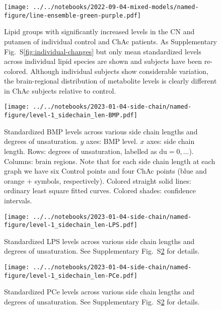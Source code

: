 \documentclass[letterpaper]{article}
\begin{document}
\begin{figure}[p]
\begin{center}
	\texttt{[image: ../../notebooks/2022-09-04-mixed-models/named-figure/line-ensemble-green-purple.pdf]}
\end{center}
	\caption[Significant lipid changes in individual control and ChAc patients II.]{
		Lipid groups with significantly increased levels in the CN and putamen of
		individual control and ChAc patients. As Supplementary Fig.~S\ref{fig:individual-changes} but only mean standardized levels across
		individual lipid species are shown and subjects have been re-colored.
		Although individual subjects show considerable variation, the
		brain-regional distribution of metabolite levels is clearly different in ChAc subjects
		relative to control.
}
\label{fig:individual-changes-simple}
\end{figure}

\begin{figure}[p]
	\texttt{[image: ../../notebooks/2023-01-04-side-chain/named-figure/level-1\_sidechain\_len-BMP.pdf]}
	\caption[BMP levels across various side chain lengths and degrees of unsaturation]{
		Standardized BMP levels across various side chain lengths and degrees of unsaturation.
		$y$ axes: BMP level. $x$ axes: side chain length. Rows: 
		degrees of unsaturation, labelled as $\mathrm{du} = 0,...$). Columns:
		brain regions.
		Note that for each side chain length at each
		graph we have six Control points and four ChAc points (blue and orange $+$
		symbols, respectively).  Colored straight solid lines: ordinary
		least square fitted curves.  Colored shades: confidence intervals.
}
\label{fig:sidechain-BMP}
\end{figure}


\begin{figure}[p]
	\texttt{[image: ../../notebooks/2023-01-04-side-chain/named-figure/level-1\_sidechain\_len-LPS.pdf]}
	\caption[LPS levels across various side chain lengths and degrees of unsaturation]{
		Standardized LPS levels across various side chain lengths and degrees of unsaturation.
		See Supplementary Fig.~S\ref{fig:sidechain-BMP} for details.
}
\label{fig:sidechain-LPS}
\end{figure}


\begin{figure}[p]
	\texttt{[image: ../../notebooks/2023-01-04-side-chain/named-figure/level-1\_sidechain\_len-PCe.pdf]}
	\caption[PCe levels across various side chain lengths and degrees of unsaturation]{
		Standardized PCe levels across various side chain lengths and degrees of unsaturation.
		See Supplementary Fig.~S\ref{fig:sidechain-BMP} for details.
}
\label{fig:sidechain-PCe}
\end{figure}
\end{document}
